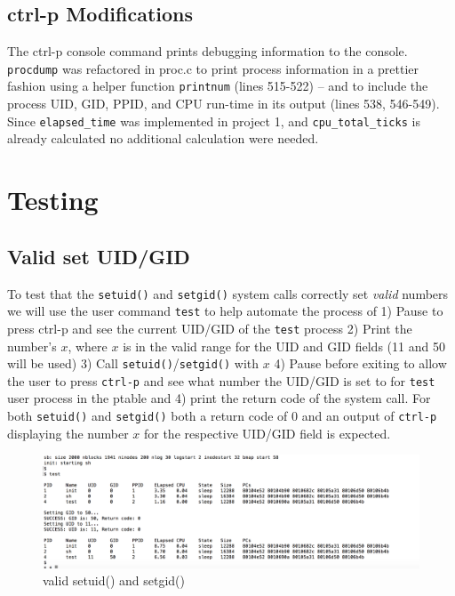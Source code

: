 \documentclass[11pt,letterpaper]{report}
\begin{document}
	\subsection*{ctrl-p Modifications}
	The ctrl-p console command prints debugging information to the console. 	{\tt procdump} was refactored in proc.c to print process information in a prettier fashion using a
	helper function {\tt printnum} (lines 515-522) -- and to include the process UID, GID, PPID, and CPU run-time in its output (lines 538, 546-549). Since {\tt elapsed\_time} was 
	implemented in project 1, and {\tt cpu\_total\_ticks} is already calculated no additional calculation were needed. 	




	\newpage
	
	
	
	\section*{Testing}
	
	\subsection*{Valid set UID/GID}
	To test that the {\tt setuid()} and {\tt setgid()} system calls correctly set \emph{valid} numbers we will use the user command {\tt test} to help automate the process of 
	1) Pause to press ctrl-p and see the current UID/GID of the {\tt test} process
	2) Print the number's $x$, where $x$ is in the valid range for the UID and GID fields (11 and 50 will be used)
	3) Call {\tt setuid()}/{\tt setgid()} with $x$ 
	4) Pause before exiting to allow the user to press {\tt ctrl-p} and see what number the UID/GID is set to for {\tt test} user process in the ptable and 
	4) print the return code of the system call. 
	For both {\tt setuid()} and {\tt setgid()} both a return code of $0$ and an output of {\tt ctrl-p} displaying the number $x$ for the respective UID/GID field is expected.

\begin{figure}[h!]
\centering
\includegraphics[width=0.8\linewidth]{setuid-setgid.png}
\caption[valid setuid() and setgid()]{valid setuid() and setgid()}
\label{fig:datetest}
\end{figure}	
	
\end{document}
